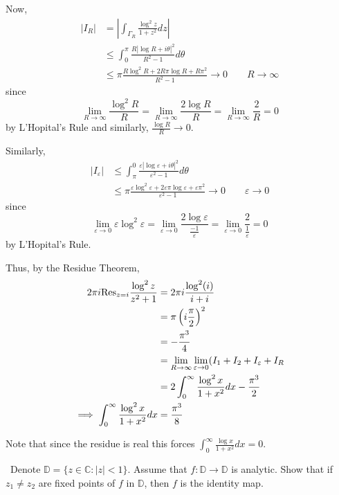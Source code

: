\documentclass[12pt]{Qual}
\begin{document}
\begin{solution}
Now, \begin{align*}
    |I_R|&=\left|\int_{\Gamma_R}\frac{\log^2 z}{1+z^2}dz\right|\\
    &\le\int_0^\pi\frac{R|\log R+i\theta|^2}{R^2-1}d\theta\\
    &\le \pi\frac{R\log^2 R+2R\pi\log R+R\pi^2}{R^2-1}\to0\qquad R\to\infty
\end{align*}
 since $$\lim_{R\to\infty}\frac{\log^2R}{R}=\lim_{R\to\infty}\frac{2\log R}{R}=\lim_{R\to\infty}\frac{2}{R}=0$$ by L'Hopital's Rule and similarly, $\frac{\log R}{R}\to0$.

 Similarly, \begin{align*}
     |I_\varepsilon|&\le \int_\pi^0\frac{\varepsilon|\log\varepsilon+i\theta|^2}{\varepsilon^2-1}d\theta\\
     &\le \pi\frac{\varepsilon\log^2 \varepsilon+2\varepsilon\pi\log \varepsilon+\varepsilon\pi^2}{\varepsilon^2-1}\to0\qquad \varepsilon\to0
 \end{align*} since $$\lim_{\varepsilon\to0}\varepsilon\log^2\varepsilon=\lim_{\varepsilon\to0}\frac{2\log \varepsilon}{\frac{-1}{\varepsilon}}=\lim_{\varepsilon\to0}\frac{2}{\frac{1}{\varepsilon}}=0$$ by L'Hopital's Rule.

 Thus, by the Residue Theorem, \begin{align*}
     2\pi i\text{Res}_{z=i}\frac{\log^2 z}{z^2+1}&=2\pi i\frac{\log^2(i)}{i+i}\\
     &=\pi\left(i\frac{\pi}{2}\right)^2\\
     &=-\frac{\pi^3}{4}\\
     &=\lim_{R\to\infty}\lim_{\varepsilon\to0}(I_1+I_2+I_\varepsilon+I_R\\
     &=2\int_0^\infty\frac{\log^2 x}{1+x^2}dx-\frac{\pi^3}{2}\\
     \implies \int_0^\infty\frac{\log^2 x}{1+x^2}dx&=\frac{\pi^3}{8}
 \end{align*}

Note that since the residue is real this forces $\displaystyle \int_0^\infty\frac{\log x}{1+x^2}dx=0$.
\end{solution}
\newpage





\begin{problem} $\,$
Denote $\mathbb{D}=\{z\in\mathbb{C}:|z|<1\}.$ Assume that $f:\mathbb{D}\to\mathbb{D}$ is analytic. Show that if $z_1\not=z_2$ are fixed points of $f$ in $\mathbb{D}$, then $f$ is the identity map.
\end{problem}
\end{document}
